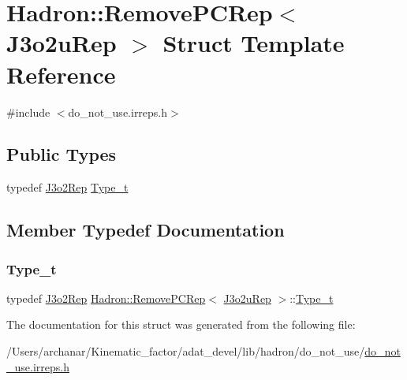 \hypertarget{structHadron_1_1RemovePCRep_3_01J3o2uRep_01_4}{}\section{Hadron\+:\+:Remove\+P\+C\+Rep$<$ J3o2u\+Rep $>$ Struct Template Reference}
\label{structHadron_1_1RemovePCRep_3_01J3o2uRep_01_4}


{\ttfamily \#include $<$do\+\_\+not\+\_\+use.\+irreps.\+h$>$}

\subsection*{Public Types}
\begin{DoxyCompactItemize}
\item 
typedef \mbox{\hyperlink{structHadron_1_1J3o2Rep}{J3o2\+Rep}} \mbox{\hyperlink{structHadron_1_1RemovePCRep_3_01J3o2uRep_01_4_a589ac9849b0ccd9ee4e8affe500daad5}{Type\+\_\+t}}
\end{DoxyCompactItemize}


\subsection{Member Typedef Documentation}
\mbox{\label{structHadron_1_1RemovePCRep_3_01J3o2uRep_01_4_a589ac9849b0ccd9ee4e8affe500daad5}} 
\subsubsection{\texorpdfstring{Type\_t}{Type\_t}}
{\footnotesize\ttfamily typedef \mbox{\hyperlink{structHadron_1_1J3o2Rep}{J3o2\+Rep}} \mbox{\hyperlink{structHadron_1_1RemovePCRep}{Hadron\+::\+Remove\+P\+C\+Rep}}$<$ \mbox{\hyperlink{structHadron_1_1J3o2uRep}{J3o2u\+Rep}} $>$\+::\mbox{\hyperlink{structHadron_1_1RemovePCRep_3_01J3o2uRep_01_4_a589ac9849b0ccd9ee4e8affe500daad5}{Type\+\_\+t}}}



The documentation for this struct was generated from the following file\+:\begin{DoxyCompactItemize}
\item 
/\+Users/archanar/\+Kinematic\+\_\+factor/adat\+\_\+devel/lib/hadron/do\+\_\+not\+\_\+use/\mbox{\hyperlink{do__not__use_8irreps_8h}{do\+\_\+not\+\_\+use.\+irreps.\+h}}\end{DoxyCompactItemize}
